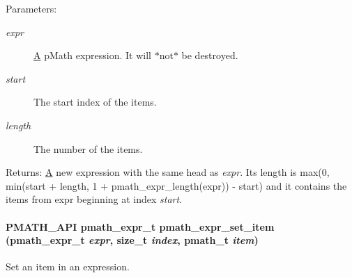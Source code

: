 \begin{Desc}
\item[Parameters:]
\begin{description}
\item[{\em expr}]\hyperlink{class_a}{A} pMath expression. It will $\ast$not$\ast$ be destroyed. \item[{\em start}]The start index of the items. \item[{\em length}]The number of the items. \end{description}
\end{Desc}
\begin{Desc}
\item[Returns:]\hyperlink{class_a}{A} new expression with the same head as {\em expr\/}. Its length is max(0, min(start + length, 1 + pmath\_\-expr\_\-length(expr)) - start) and it contains the items from expr beginning at index {\em start\/}. \end{Desc}
\hypertarget{group__expressions_g2771a8ad79e108e60df5dbe3ea9c7bf8}{
\paragraph[{pmath\_\-expr\_\-set\_\-item}]{\setlength{\rightskip}{0pt plus 5cm}PMATH\_\-API {\bf pmath\_\-expr\_\-t} pmath\_\-expr\_\-set\_\-item ({\bf pmath\_\-expr\_\-t} {\em expr}, \/  size\_\-t {\em index}, \/  {\bf pmath\_\-t} {\em item})}\hfill}
\label{group__expressions_g2771a8ad79e108e60df5dbe3ea9c7bf8}


Set an item in an expression. 

